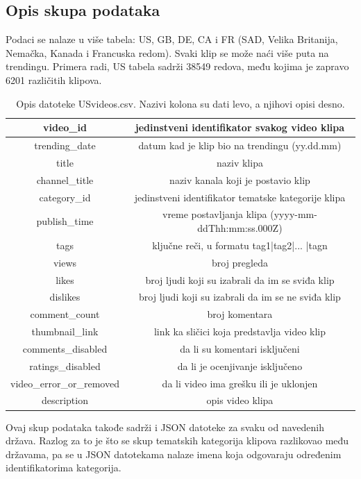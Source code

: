\documentclass[a4paper]{article}
\theoremstyle{definition}
\begin{document}
\subsection{Opis skupa podataka}
Podaci se nalaze u više tabela: US, GB, DE,
CA i FR (SAD, Velika Britanija, Nemačka, Kanada i Francuska redom). 
Svaki klip se može naći više puta na trendingu.
Primera radi, US tabela sadrži 38549 redova, među kojima je zapravo  6201 različitih klipova.


\begin{table}[h!]
\centering
\begin{tabular}{ |c|c| } 
 \hline
 video\_id & jedinstveni identifikator svakog video klipa  \\ 
\hline
 trending\_date & datum kad je klip bio na trendingu (yy.dd.mm)  \\ 
\hline
 title & naziv klipa  \\ 
\hline
 channel\_title & naziv kanala koji je postavio klip  \\ 
\hline
 category\_id & jedinstveni identifikator tematske kategorije klipa  \\ 
\hline
publish\_time & vreme postavljanja klipa (yyyy-mm-ddThh:mm:ss.000Z)\\ 
\hline
tags & ključne reči, u formatu tag1|tag2|... |tagn  \\ 
\hline
views & broj pregleda  \\ 
\hline
likes & broj ljudi koji su izabrali da im se sviđa klip\\ 
\hline
dislikes & broj ljudi koji su izabrali da im se ne sviđa klip   \\ 
\hline
comment\_count & broj komentara \\ 
\hline
thumbnail\_link & link ka sličici koja predstavlja video klip  \\ 
\hline
comments\_disabled & da li su komentari isključeni  \\ 
\hline
ratings\_disabled & da li je ocenjivanje isključeno \\ 
\hline
video\_error\_or\_removed & da li video ima grešku ili je uklonjen  \\ 
\hline
description & opis video klipa  \\ 
 \hline
\end{tabular}
\caption{Opis datoteke USvideos.csv. Nazivi kolona su dati levo, a njihovi opisi desno.}
\label{table:1}
\end{table}

Ovaj skup podataka takođe sadrži i JSON datoteke za svaku od navedenih država.
Razlog za to je što se skup tematskih kategorija klipova razlikovao među državama, pa se u JSON datotekama nalaze imena koja odgovaraju određenim identifikatorima kategorija.
\end{document}
